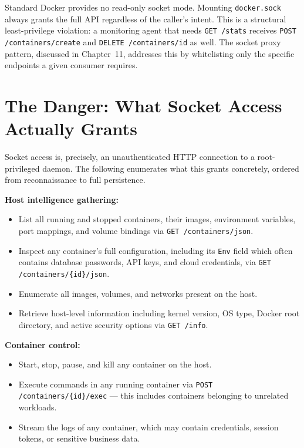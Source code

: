 Standard Docker provides no read-only socket mode. Mounting \texttt{docker.sock}
always grants the full API regardless of the caller's intent. This is a structural
least-privilege violation: a monitoring agent that needs \texttt{GET /stats} receives
\texttt{POST /containers/create} and \texttt{DELETE /containers/{id}} as well. The
socket proxy pattern, discussed in Chapter~11, addresses this by whitelisting only
the specific endpoints a given consumer requires.

\newpage

\section{The Danger: What Socket Access Actually Grants}
\label{sec:socket-danger}

Socket access is, precisely, an unauthenticated HTTP connection to a root-privileged
daemon. The following enumerates what this grants concretely, ordered from
reconnaissance to full persistence.

\textbf{Host intelligence gathering:}

\begin{itemize}
    \item List all running and stopped containers, their images, environment variables,
          port mappings, and volume bindings via \texttt{GET /containers/json}.
    \item Inspect any container's full configuration, including its \texttt{Env} field
          which often contains database passwords, API keys, and cloud credentials,
          via \texttt{GET /containers/\{id\}/json}.
    \item Enumerate all images, volumes, and networks present on the host.
    \item Retrieve host-level information including kernel version, OS type, Docker
          root directory, and active security options via \texttt{GET /info}.
\end{itemize}

\textbf{Container control:}

\begin{itemize}
    \item Start, stop, pause, and kill any container on the host.
    \item Execute commands in any running container via
          \texttt{POST /containers/\{id\}/exec} --- this includes containers belonging
          to unrelated workloads.
    \item Stream the logs of any container, which may contain credentials, session
          tokens, or sensitive business data.
\end{itemize}

